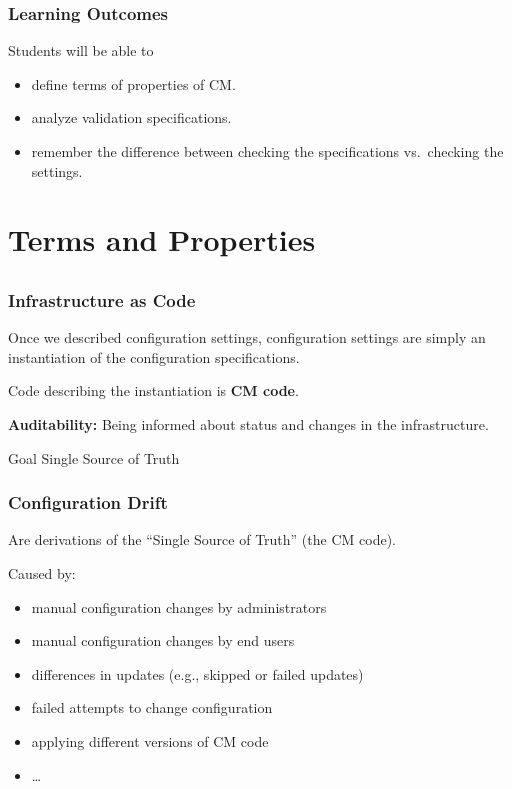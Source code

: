 \begin{frame}
	\frametitle{Learning Outcomes}
	Students will be able to
	\begin{itemize}
	\item define terms of properties of CM.
	\item analyze validation specifications.
	\item remember the difference between checking the specifications vs.\ checking the settings.
	\end{itemize}
\end{frame}

\section{Terms and Properties}
\subsection{}

\begin{frame}
	\frametitle{Infrastructure as Code}

	Once we described configuration settings,
	configuration settings are simply an instantiation of the configuration specifications.
	\vspace{1em}

	Code describing the instantiation is \textbf{CM code}.
	\vspace{1em}

	\textbf{Auditability:}
	Being informed about status and changes in the infrastructure.
	\vspace{1em}

	\begin{alertblock}{Goal}
	Single Source of Truth
	\end{alertblock}
\end{frame}

\begin{frame}
	\frametitle{Configuration Drift}

	Are derivations of the ``Single Source of Truth'' (the CM code).

	Caused by:

	\pause

	\begin{itemize}[<+-| alert@+>]
	\item manual configuration changes by administrators
	\item manual configuration changes by end users
	\item differences in updates (e.g., skipped or failed updates)
	\item failed attempts to change configuration
	\item applying different versions of CM code
	\item \dots
	\end{itemize}
\end{frame}

